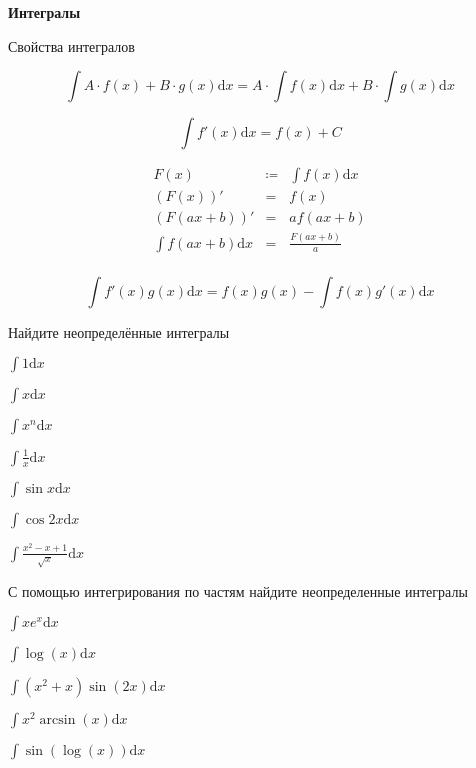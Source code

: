 \documentclass{article}
\begin{document}
    \large


    \begin{center}
        \textbf{Интегралы}
    \end{center}

    Свойства интегралов
    \begin{enumerate_boxed}
        \item \[\int A\cdot f(x) + B\cdot g(x) \mathrm{d}x = A \cdot \int f(x) \mathrm{d}x + B\cdot \int g(x) \mathrm{d}x\]
        \item \[\int f'(x) \mathrm{d}x = f(x) + C\]
        \item
        \begin{eqnarray*}
            F(x) &\coloneqq& \int f(x) \mathrm{d}x\\
            (F(x))' &=& f(x)\\
            (F(ax + b))' &=& af(ax + b)\\
            \int f(ax + b) \mathrm{d}x &=& \frac{F(ax + b)}{a}\\
        \end{eqnarray*}
        \item \[\int f'(x)g(x) \mathrm{d}x = f(x)g(x) - \int f(x)g'(x) \mathrm{d}x\]
    \end{enumerate_boxed}

    Найдите неопределённые интегралы
    \begin{enumerate_boxed}
        \setcounter{enumi}{4}
        \begin{multicols}{3}
            \item $\displaystyle{\int 1 \mathrm{d}x}$
            \item $\displaystyle{\int x \mathrm{d}x}$
            \item $\displaystyle{\int x^n \mathrm{d}x}$
            \item $\displaystyle{\int \frac{1}{x} \mathrm{d}x}$
            \item $\displaystyle{\int \sin{x} \mathrm{d}x}$
            \item $\displaystyle{\int \cos{2x} \mathrm{d}x}$
            \item $\displaystyle{\int \frac{x^2 - x + 1}{\sqrt{x}} \mathrm{d}x}$
        \end{multicols}
    \end{enumerate_boxed}

    С помощью интегрирования по частям найдите неопределенные интегралы
    \begin{enumerate_boxed}
        \setcounter{enumi}{11}
        \begin{multicols}{3}
            \item $\displaystyle{\int x e^x \mathrm{d}x}$
            \item $\displaystyle{\int \log(x) \mathrm{d}x}$
            \item $\displaystyle{\int (x^2 + x)\sin(2x) \mathrm{d}x}$
            \item $\displaystyle{\int x^2\arcsin(x) \mathrm{d}x}$
            \item $\displaystyle{\int \sin(\log(x)) \mathrm{d}x}$
        \end{multicols}
    \end{enumerate_boxed}
\end{document}
